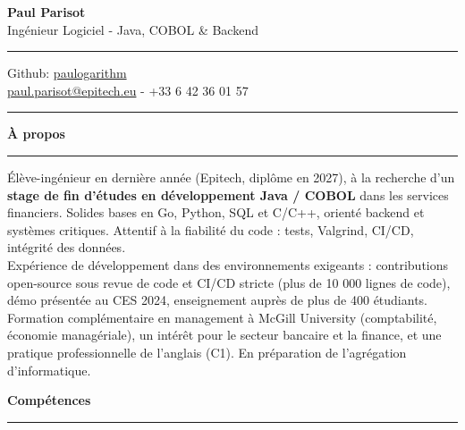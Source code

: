 \documentclass[9pt]{extarticle}
\begin{document}
\begin{center}
	{\huge\bfseries Paul Parisot}
	\\[4pt]
	{\Large Ingénieur Logiciel - Java, COBOL \& Backend}
	\\
\end{center}

\par\vspace{-5pt}
\rule{\linewidth}{0.4pt}
\par\vspace{-5pt}

\begin{center}
	Github: \href{https://github.com/paulogarithm}{paulogarithm}
	\\
	\href{mailto:paul.parisot@epitech.eu}{paul.parisot@epitech.eu} - +33 6 42 36 01 57
	\\
\end{center}

\par\vspace{-10pt}
\rule{\linewidth}{0.4pt}
\par\vspace{7pt}

{\large\bfseries À propos}
\par\vspace{-8pt}
\rule{\linewidth}{0.4pt}
\par\vspace{5pt}

Élève-ingénieur en dernière année (Epitech, diplôme en 2027), à la recherche d'un {\bfseries stage de fin d'études en développement Java / COBOL} dans les services financiers. Solides bases en Go, Python, SQL et C/C++, orienté backend et systèmes critiques. Attentif à la fiabilité du code : tests, Valgrind, CI/CD, intégrité des données.
\\
Expérience de développement dans des environnements exigeants : contributions open-source sous revue de code et CI/CD stricte (plus de 10 000 lignes de code), démo présentée au CES 2024, enseignement auprès de plus de 400 étudiants.
\\
Formation complémentaire en management à McGill University (comptabilité, économie managériale), un intérêt pour le secteur bancaire et la finance, et une pratique professionnelle de l'anglais (C1). En préparation de l'agrégation d'informatique.
\par\vspace{5pt}

{\large\bfseries Compétences}
\par\vspace{-8pt}
\rule{\linewidth}{0.4pt}
\par\vspace{5pt}
\end{document}
